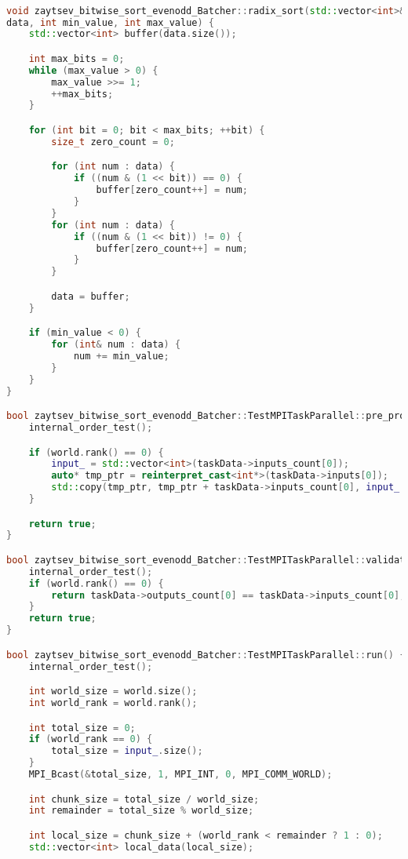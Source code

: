 \documentclass[12pt]{article}
\begin{document}
\begin{lstlisting}[language=C++]

void zaytsev_bitwise_sort_evenodd_Batcher::radix_sort(std::vector<int>&
data, int min_value, int max_value) {
    std::vector<int> buffer(data.size());

    int max_bits = 0;
    while (max_value > 0) {
        max_value >>= 1;
        ++max_bits;
    }

    for (int bit = 0; bit < max_bits; ++bit) {
        size_t zero_count = 0;

        for (int num : data) {
            if ((num & (1 << bit)) == 0) {
                buffer[zero_count++] = num;
            }
        }
        for (int num : data) {
            if ((num & (1 << bit)) != 0) {
                buffer[zero_count++] = num;
            }
        }

        data = buffer;
    }

    if (min_value < 0) {
        for (int& num : data) {
            num += min_value;
        }
    }
}

bool zaytsev_bitwise_sort_evenodd_Batcher::TestMPITaskParallel::pre_processing() {
    internal_order_test();

    if (world.rank() == 0) {
        input_ = std::vector<int>(taskData->inputs_count[0]);
        auto* tmp_ptr = reinterpret_cast<int*>(taskData->inputs[0]);
        std::copy(tmp_ptr, tmp_ptr + taskData->inputs_count[0], input_.begin());
    }

    return true;
}

bool zaytsev_bitwise_sort_evenodd_Batcher::TestMPITaskParallel::validation() {
    internal_order_test();
    if (world.rank() == 0) {
        return taskData->outputs_count[0] == taskData->inputs_count[0];
    }
    return true;
}

bool zaytsev_bitwise_sort_evenodd_Batcher::TestMPITaskParallel::run() {
    internal_order_test();

    int world_size = world.size();
    int world_rank = world.rank();

    int total_size = 0;
    if (world_rank == 0) {
        total_size = input_.size();
    }
    MPI_Bcast(&total_size, 1, MPI_INT, 0, MPI_COMM_WORLD);

    int chunk_size = total_size / world_size;
    int remainder = total_size % world_size;

    int local_size = chunk_size + (world_rank < remainder ? 1 : 0);
    std::vector<int> local_data(local_size);


\end{lstlisting}
\end{document}
